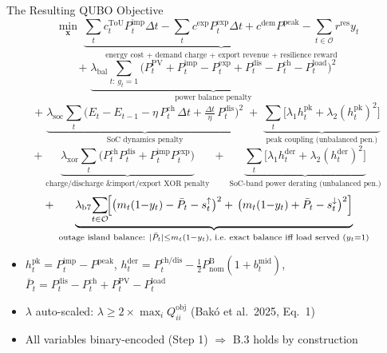\documentclass[aspectratio=169]{beamer}
\begin{document}
\begin{frame}{The Resulting QUBO Objective}
\scriptsize
\[
\min_{\mathbf{x}}\;
\underbrace{
  \sum_t c^{\text{ToU}}_t P^{\text{imp}}_t \Delta t
  - \sum_t c^{\text{exp}} P^{\text{exp}}_t \Delta t
  + c^{\text{dem}} P^{\text{peak}}
  - \sum_{t\in\mathcal{O}} r^{\text{res}} y_t
}_{\text{energy cost + demand charge + export revenue + resilience reward}}
\]
\vspace{-0.5em}
\[
+\;
\underbrace{
  \lambda_{\text{bal}}\sum_{t:\,g_t=1}
  \bigl(P^{\text{PV}}_t + P^{\text{imp}}_t - P^{\text{exp}}_t
        + P^{\text{dis}}_t - P^{\text{ch}}_t - P^{\text{load}}_t\bigr)^2
}_{\text{power balance penalty}}
\]
\vspace{-0.5em}
\[
+\;
\underbrace{
  \lambda_{\text{soc}}\sum_t
  \bigl(E_t - E_{t-1} - \eta\,P^{\text{ch}}_t\,\Delta t
        + \tfrac{\Delta t}{\eta}\,P^{\text{dis}}_t\bigr)^2
}_{\text{SoC dynamics penalty}}
\;+\;
\underbrace{\sum_t\bigl[\lambda_1 h^{\text{pk}}_t + \lambda_2 (h^{\text{pk}}_t)^2\bigr]}_{\text{peak coupling (unbalanced pen.)}}
\]
\vspace{-0.5em}
\[
+\;
\underbrace{\lambda_{\text{xor}}\sum_t \bigl(P^{\text{ch}}_t P^{\text{dis}}_t
  + P^{\text{imp}}_t P^{\text{exp}}_t\bigr)}_{\text{charge/discharge \& import/export XOR penalty}}
\;+\;
\underbrace{\sum_t\bigl[\lambda_1 h^{\text{der}}_t + \lambda_2 (h^{\text{der}}_t)^2\bigr]}_{\text{SoC-band power derating (unbalanced pen.)}}
\]
\vspace{-0.5em}
\[
+\;
\underbrace{
  \lambda_{\text{b7}}\!\sum_{t\in\mathcal{O}}\!\Bigl[
    \bigl(m_t(1{-}y_t) - \bar{P}_t - s_t^{\uparrow}\bigr)^2
    +\,\bigl(m_t(1{-}y_t) + \bar{P}_t - s_t^{\downarrow}\bigr)^2
  \Bigr]
}_{\text{outage island balance: } |\bar{P}_t|\le m_t(1-y_t),\text{ i.e.\ exact balance iff load served } (y_t=1)}
\]
\vspace{0.1cm}
\begin{itemize}
    \item $h^{\text{pk}}_t = P^{\text{imp}}_t - P^{\text{peak}}$,\quad
          $h^{\text{der}}_t = P^{\text{ch/dis}}_t - \tfrac{1}{2}P^{\text{B}}_{\text{nom}}(1+b^{\text{mid}}_t)$,\quad
          $\bar{P}_t = P^{\text{dis}}_t - P^{\text{ch}}_t + P^{\text{PV}}_t - P^{\text{load}}_t$
    \item $\lambda$ auto-scaled: $\lambda \ge 2\times\max_i Q_{ii}^{\text{obj}}$
          \small(Bak\'{o} et al.\ 2025, Eq.~1)
    \item All variables binary-encoded (Step 1) $\Rightarrow$ B.3 holds by construction
\end{itemize}
\end{frame}
\end{document}
